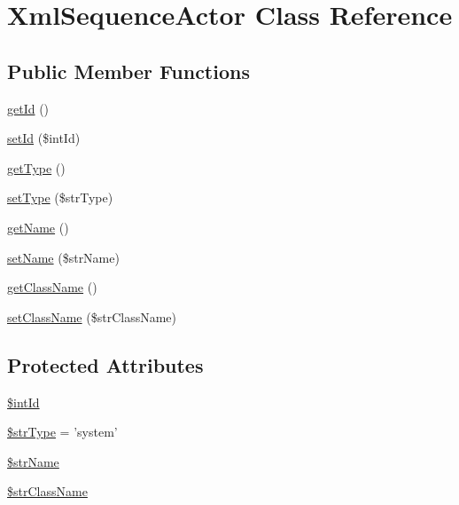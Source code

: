 \hypertarget{class_xml_sequence_actor}{
\section{XmlSequenceActor Class Reference}
\label{class_xml_sequence_actor}
}
\subsection*{Public Member Functions}
\begin{CompactItemize}
\item 
\hyperlink{class_xml_sequence_actor_47f896a3346344e6eae51239fa53e813}{getId} ()
\item 
\hyperlink{class_xml_sequence_actor_89df5af9ea1af66ca409443fba39a3e4}{setId} (\$intId)
\item 
\hyperlink{class_xml_sequence_actor_d0be22bbf0425675beabb6f3ea81a8e5}{getType} ()
\item 
\hyperlink{class_xml_sequence_actor_32eb3733e67e46091c032709d88e6088}{setType} (\$strType)
\item 
\hyperlink{class_xml_sequence_actor_9a15dbaba511bef833d66240f927a04b}{getName} ()
\item 
\hyperlink{class_xml_sequence_actor_98d68b62f00bff3c2f72ce7da351f52c}{setName} (\$strName)
\item 
\hyperlink{class_xml_sequence_actor_a0e9b0bda1ded8557d7ea610dddb7fed}{getClassName} ()
\item 
\hyperlink{class_xml_sequence_actor_53cd7e43931750fc57a198cb00d2ba24}{setClassName} (\$strClassName)
\end{CompactItemize}
\subsection*{Protected Attributes}
\begin{CompactItemize}
\item 
\hyperlink{class_xml_sequence_actor_dd493b41d7dee80396a221877c3dd03e}{\$intId}
\item 
\hyperlink{class_xml_sequence_actor_ebf4a5295ed4ecbbf2a108a8345f1a80}{\$strType} = 'system'
\item 
\hyperlink{class_xml_sequence_actor_d280c64839b80da1e32256f2372b5a52}{\$strName}
\item 
\hyperlink{class_xml_sequence_actor_a2d9ac4998253ff27d78df9bae5c0e15}{\$strClassName}
\end{CompactItemize}


